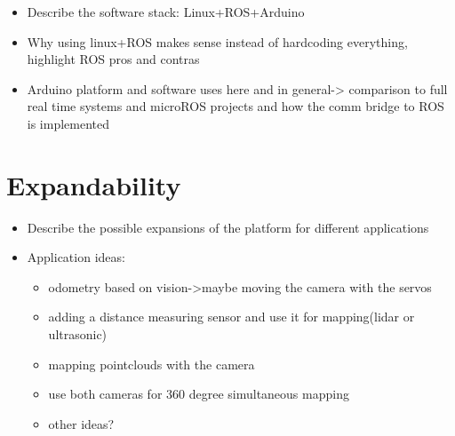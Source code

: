 \begin{itemize}
 \item Describe the software stack: Linux+ROS+Arduino
 \item Why using linux+ROS makes sense instead of hardcoding everything, highlight ROS pros and contras
 \item Arduino platform and software uses here and in general-> comparison to full real time systems and microROS projects and how the comm bridge to ROS is implemented
\end{itemize}

\section{Expandability}
\pagestyle{scrheadings}

\begin{itemize}
 \item Describe the possible expansions of the platform for different applications
 \item Application ideas: 
 \begin{itemize}
 \item odometry based on vision->maybe moving the camera with the servos
 \item adding a distance measuring sensor and use it for mapping(lidar or ultrasonic)
 \item mapping pointclouds with the camera
 \item use both cameras for 360 degree simultaneous mapping
 \item other ideas?
 \end{itemize}
\end{itemize}


